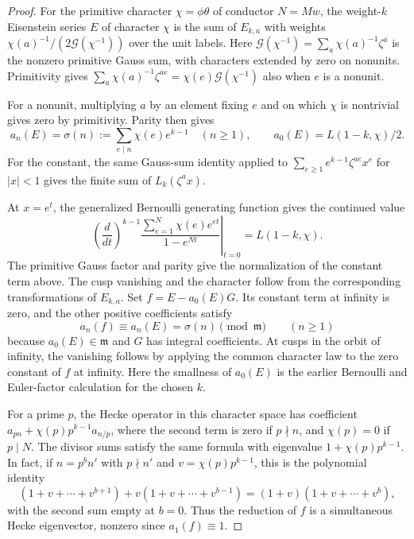 \begin{proof}
For the primitive character \(\chi=\phi\theta\) of conductor
\(N=Mw\), the weight-\(k\) Eisenstein series \(E\) of character
\(\chi\) is the sum of \(E_{k,a}\) with weights
\(\chi(a)^{-1}/(2\mathcal G(\chi^{-1}))\) over the unit labels.
Here \(\mathcal G(\chi^{-1})=\sum_a\chi(a)^{-1}\zeta^a\)
is the nonzero primitive Gauss sum, with characters extended
by zero on nonunits. Primitivity gives
\(\sum_a\chi(a)^{-1}\zeta^{ae}=\chi(e)\mathcal G(\chi^{-1})\)
also when \(e\) is a nonunit.

For a nonunit, multiplying
\(a\) by an element fixing \(e\) and on which \(\chi\) is
nontrivial gives zero by primitivity. Parity then gives
\[
    a_n(E)=\sigma(n):=\sum_{e\mid n}\chi(e)e^{k-1}
    \quad(n\geq1),\qquad a_0(E)=L(1-k,\chi)/2 .
\]
For the constant, the same Gauss-sum identity applied
to \(\sum_{e\geq1} e^{k-1}\zeta^{ae}x^e\) for \(|x|<1\)
gives the finite sum of \(L_k(\zeta^a x)\).

At \(x=e^t\), the generalized Bernoulli generating
function gives the continued value
\[
 \left.\left(\frac{d}{dt}\right)^{k-1}
            \frac{\sum_{e=1}^N\chi(e)e^{et}}{1-e^{Nt}}
       \right|_{t=0}=L(1-k,\chi).
\]
The primitive Gauss factor and parity give the normalization of
the constant term above. The cusp vanishing and the character follow
from the corresponding transformations of \(E_{k,a}\).
Set \(f=E-a_0(E)G\). Its constant term at infinity is zero,
and the other positive coefficients satisfy
\[
      a_n(f)\equiv a_n(E)=\sigma(n)\pmod{\mathfrak m}\qquad(n\ge1)
\]
because \(a_0(E)\in\mathfrak m\) and \(G\) has integral coefficients. At cusps in the orbit of infinity,
the vanishing follows by applying the common character law
to the zero constant of \(f\) at infinity. Here the smallness
of \(a_0(E)\) is the earlier Bernoulli and Euler-factor
calculation for the chosen \(k\).

For a prime \(p\), the Hecke operator in this character space has
coefficient \(a_{pn}+\chi(p)p^{k-1}a_{n/p}\), where the second
term is zero if \(p\nmid n\), and \(\chi(p)=0\) if \(p\mid N\).
The divisor sums satisfy the same formula with eigenvalue
\(1+\chi(p)p^{k-1}\). In fact, if \(n=p^b n'\) with
\(p\nmid n'\) and \(v=\chi(p)p^{k-1}\), this is the polynomial
identity
\[
  (1+v+\cdots+v^{b+1})+v(1+v+\cdots+v^{b-1})
      =(1+v)(1+v+\cdots+v^b),
\]
with the second sum empty at \(b=0\).
Thus the reduction of \(f\) is a simultaneous Hecke
eigenvector, nonzero since \(a_1(f)\equiv1\).

\end{proof}

